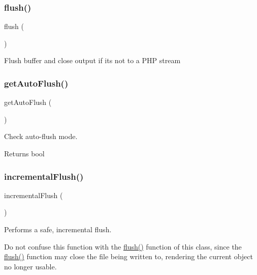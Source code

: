 \subsubsection{\texorpdfstring{flush()}{flush()}}
{\footnotesize\ttfamily flush (\begin{DoxyParamCaption}{ }\end{DoxyParamCaption})}

Flush buffer and close output if it\textquotesingle{}s not to a P\+HP stream \mbox{\label{class_p_h_p_unit___util___printer_a7f7730a383eca33e065cd8e709f5de12}} 
\subsubsection{\texorpdfstring{get\+Auto\+Flush()}{getAutoFlush()}}
{\footnotesize\ttfamily get\+Auto\+Flush (\begin{DoxyParamCaption}{ }\end{DoxyParamCaption})}

Check auto-\/flush mode.

\begin{DoxyReturn}{Returns}
bool 
\end{DoxyReturn}
\mbox{\label{class_p_h_p_unit___util___printer_acf90e383b291bfaaccee1014f70fe3dc}} 
\subsubsection{\texorpdfstring{incremental\+Flush()}{incrementalFlush()}}
{\footnotesize\ttfamily incremental\+Flush (\begin{DoxyParamCaption}{ }\end{DoxyParamCaption})}

Performs a safe, incremental flush.

Do not confuse this function with the \mbox{\hyperlink{class_p_h_p_unit___util___printer_a7751f77b5263bcf940ece6e824a05b38}{flush()}} function of this class, since the \mbox{\hyperlink{class_p_h_p_unit___util___printer_a7751f77b5263bcf940ece6e824a05b38}{flush()}} function may close the file being written to, rendering the current object no longer usable. \mbox{\label{class_p_h_p_unit___util___printer_a5513242b573a539641e99f27182b7623}} 
